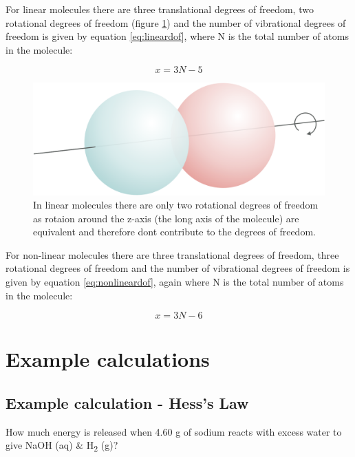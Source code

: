 \documentclass[
]{book}
\begin{document}
For linear molecules there are three translational degrees of freedom, two rotational degrees of freedom (figure \ref{fig:linear}) and the number of vibrational degrees of freedom is given by equation \eqref{eq:lineardof}, where N is the total number of atoms in the molecule:

\begin{equation}
x = 3N-5
\label{eq:lineardof}
\end{equation}

\begin{figure}

{\centering \includegraphics[width=0.5\linewidth]{images/linear} 

}

\caption{In linear molecules there are only two rotational degrees of freedom as rotaion around the z-axis (the long axis of the molecule) are equivalent and therefore dont contribute to the degrees of freedom.}\label{fig:linear}
\end{figure}

For non-linear molecules there are three translational degrees of freedom, three rotational degrees of freedom and the number of vibrational degrees of freedom is given by equation \eqref{eq:nonlineardof}, again where N is the total number of atoms in the molecule:

\begin{equation}
x = 3N-6
\label{eq:nonlineardof}
\end{equation}

\hypertarget{example-calculations}{%
\section{Example calculations}\label{example-calculations}}

\hypertarget{sec:examplehess}{%
\subsection{Example calculation - Hess's Law}\label{sec:examplehess}}

How much energy is released when 4.60 g of sodium reacts with excess water to give NaOH (aq) \& H\textsubscript{2} (g)?
\end{document}
